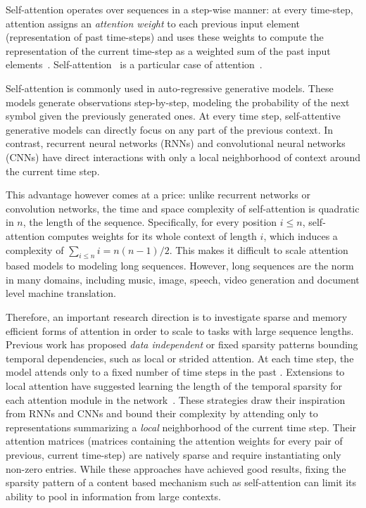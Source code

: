 \documentclass[a4paper]{article}
\begin{document}
Self-attention operates over sequences in a step-wise manner: at 
every time-step, attention assigns an \emph{attention weight} to each 
previous input element (representation 
of past time-steps) and uses these weights to compute the representation of the current 
time-step as a weighted sum of the past input elements~\citep{vaswani2017attention}. 
Self-attention~\citep{shaw2018self} is a particular case of attention~\citep{bahdanau2014neural,chorowski2015attention,luong2015effective}.

Self-attention is commonly used in auto-regressive generative models.
These models generate observations step-by-step, modeling the probability 
of the next symbol given the previously generated ones. At every time step, 
self-attentive generative models can directly focus on any part of the 
previous context. In contrast, recurrent neural networks (RNNs) and 
convolutional neural networks (CNNs) have direct interactions with only a 
local neighborhood of context around the current time step. 

This advantage however comes at a price: unlike recurrent networks or 
convolution networks, the time and space complexity of self-attention 
is quadratic in $n$, the length of the sequence. Specifically, for every
position $i \le n$, self-attention computes weights for its whole context of 
length $i$, which induces a complexity of $\sum_{i \le n} i = n (n-1)/2$.
This makes it difficult to scale attention based models 
to modeling long sequences. However, long sequences 
are the norm in many domains, including music, image, speech, video generation
and document level machine translation.

Therefore, an important research direction is to investigate sparse and 
memory efficient forms of attention in order to scale to tasks with large 
sequence lengths.
Previous work has proposed \emph{data independent} or fixed sparsity patterns bounding 
temporal dependencies, such as local or strided attention. At each time step, the model 
attends only to a fixed number of time steps in the past \citep{child2019generating}. 
Extensions to local attention have suggested learning the length of the temporal sparsity 
for each attention module in the network~\citep{sukhbaatar2019adaptive}. 
These strategies draw their inspiration from RNNs and CNNs and bound their 
complexity by attending only to representations summarizing a \emph{local}
neighborhood of the current time step. Their attention matrices (matrices containing
the attention weights for every pair of previous, current time-step) are natively sparse
and require instantiating only non-zero entries. While these approaches have achieved good results, fixing the sparsity pattern of a content based mechanism such as self-attention can limit its ability to pool in information from large contexts. 
\end{document}
